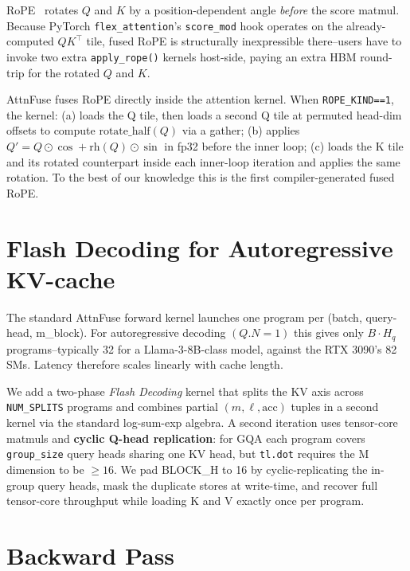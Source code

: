 \documentclass[10pt,twocolumn]{article}
\begin{document}
RoPE~\cite{su2021roformer} rotates $Q$ and $K$ by a position-dependent
angle \emph{before} the score matmul. Because PyTorch
\texttt{flex\_attention}'s \texttt{score\_mod} hook operates on the
already-computed $QK^\top$ tile, fused RoPE is structurally
inexpressible there--users have to invoke two extra
\texttt{apply\_rope()} kernels host-side, paying an extra HBM round-trip
for the rotated $Q$ and $K$.

AttnFuse fuses RoPE directly inside the attention kernel. When
\texttt{ROPE\_KIND==1}, the kernel: (a) loads the Q tile, then loads a
second Q tile at permuted head-dim offsets to compute
$\text{rotate\_half}(Q)$ via a gather; (b) applies
$Q' = Q \odot \cos + \text{rh}(Q) \odot \sin$ in fp32 before the inner
loop; (c) loads the K tile and its rotated counterpart inside each
inner-loop iteration and applies the same rotation. To the best of our
knowledge this is the first compiler-generated fused RoPE.

\section{Flash Decoding for Autoregressive KV-cache}
\label{sec:decode}

The standard AttnFuse forward kernel launches one program per
(batch, query-head, m\_block). For autoregressive decoding $(Q.N = 1)$
this gives only $B \cdot H_q$ programs--typically 32 for a
Llama-3-8B-class model, against the RTX 3090's 82 SMs. Latency therefore
scales linearly with cache length.

We add a two-phase \emph{Flash Decoding} kernel that splits the KV axis
across \texttt{NUM\_SPLITS} programs and combines partial
$(m, \ell, \text{acc})$ tuples in a second kernel via the standard
log-sum-exp algebra. A second iteration uses tensor-core matmuls and
\textbf{cyclic Q-head replication}: for GQA each program covers
\texttt{group\_size} query heads sharing one KV head, but
\texttt{tl.dot} requires the M dimension to be $\geq 16$. We pad
BLOCK\_H to 16 by cyclic-replicating the in-group query heads, mask the
duplicate stores at write-time, and recover full tensor-core throughput
while loading K and V exactly once per program.

\section{Backward Pass}
\label{sec:backward}
\end{document}
